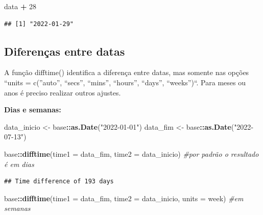 \documentclass[
]{book}
\newenvironment{Shaded}{\begin{snugshade}}{\end{snugshade}}
\newcommand{\AttributeTok}[1]{\textcolor[rgb]{0.13,0.29,0.53}{#1}}
\newcommand{\CommentTok}[1]{\textcolor[rgb]{0.56,0.35,0.01}{\textit{#1}}}
\newcommand{\DecValTok}[1]{\textcolor[rgb]{0.00,0.00,0.81}{#1}}
\newcommand{\FunctionTok}[1]{\textcolor[rgb]{0.13,0.29,0.53}{\textbf{#1}}}
\newcommand{\NormalTok}[1]{#1}
\newcommand{\OtherTok}[1]{\textcolor[rgb]{0.56,0.35,0.01}{#1}}
\newcommand{\SpecialCharTok}[1]{\textcolor[rgb]{0.81,0.36,0.00}{\textbf{#1}}}
\newcommand{\StringTok}[1]{\textcolor[rgb]{0.31,0.60,0.02}{#1}}
\theoremstyle{definition}
\theoremstyle{definition}
\theoremstyle{definition}
\theoremstyle{definition}
\theoremstyle{remark}
\begin{document}
\begin{Shaded}
\begin{Highlighting}[]
\NormalTok{data }\SpecialCharTok{+} \DecValTok{28}
\end{Highlighting}
\end{Shaded}

\begin{verbatim}
## [1] "2022-01-29"
\end{verbatim}

\hypertarget{diferenuxe7as-entre-datas}{%
\subsection{Diferenças entre datas}\label{diferenuxe7as-entre-datas}}

A função difftime() identifica a diferença entre datas, mas somente nas opções ``units = c(''auto'', ``secs'', ``mins'', ``hours'', ``days'', ``weeks'')``. Para meses ou anos é preciso realizar outros ajustes.

\textbf{Dias e semanas:}

\begin{Shaded}
\begin{Highlighting}[]
\NormalTok{data\_inicio }\OtherTok{\textless{}{-}}\NormalTok{ base}\SpecialCharTok{::}\FunctionTok{as.Date}\NormalTok{(}\StringTok{"2022{-}01{-}01"}\NormalTok{)}
\NormalTok{data\_fim }\OtherTok{\textless{}{-}}\NormalTok{ base}\SpecialCharTok{::}\FunctionTok{as.Date}\NormalTok{(}\StringTok{"2022{-}07{-}13"}\NormalTok{)}

\NormalTok{base}\SpecialCharTok{::}\FunctionTok{difftime}\NormalTok{(}\AttributeTok{time1 =}\NormalTok{ data\_fim, }\AttributeTok{time2 =}\NormalTok{ data\_inicio) }\CommentTok{\#por padrão o resultado é em dias}
\end{Highlighting}
\end{Shaded}

\begin{verbatim}
## Time difference of 193 days
\end{verbatim}

\begin{Shaded}
\begin{Highlighting}[]
\NormalTok{base}\SpecialCharTok{::}\FunctionTok{difftime}\NormalTok{(}\AttributeTok{time1 =}\NormalTok{ data\_fim, }\AttributeTok{time2 =}\NormalTok{ data\_inicio, }\AttributeTok{units =} \StringTok{\textquotesingle{}week\textquotesingle{}}\NormalTok{) }\CommentTok{\#em semanas}
\end{Highlighting}
\end{Shaded}
\end{document}
